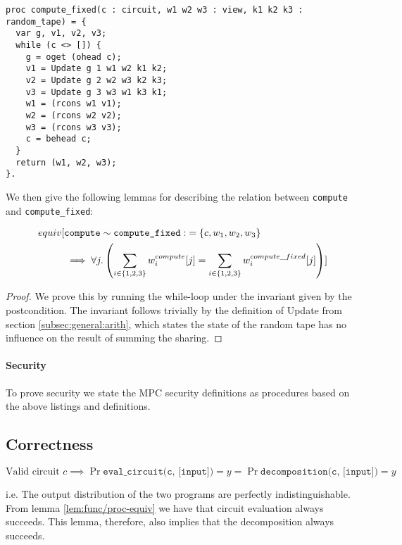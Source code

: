 \begin{lstlisting}[float,label=lst:compute-fixed,caption=Compute with fixed randomness]
proc compute_fixed(c : circuit, w1 w2 w3 : view, k1 k2 k3 : random_tape) = {
  var g, v1, v2, v3;
  while (c <> []) {
    g = oget (ohead c);
    v1 = Update g 1 w1 w2 k1 k2;
    v2 = Update g 2 w2 w3 k2 k3;
    v3 = Update g 3 w3 w1 k3 k1;
    w1 = (rcons w1 v1);
    w2 = (rcons w2 v2);
    w3 = (rcons w3 v3);
    c = behead c;
  }
  return (w1, w2, w3);
}.
\end{lstlisting}

We then give the following lemmas for describing the relation between
\texttt{compute} and \texttt{compute\_fixed}:

\begin{lemma}
  \label{lem:compute/compute-fixed}
  \begin{align*}
    equiv[&\texttt{compute} \sim \texttt{compute\_{fixed}} : \; =\{c, w_{1}, w_{2}, w_{3}\} \\
    &\implies \forall j.\left(\sum_{i \in \{1,2,3\}} w_{i}^{compute}[j] = \sum_{i \in \{1,2,3\}} w_{i}^{compute\_{fixed}}[j]\right)]
  \end{align*}
\end{lemma}
\begin{proof}
  We prove this by running the while-loop under the invariant given by the
  postcondition.
  The invariant follows trivially by the definition of Update from section
  \ref{subsec:general:arith}, which states the state of the random tape has no
  influence on the result of summing the sharing.
\end{proof}

\paragraph{Security}
To prove security we state the MPC security definitions as procedures based on
the above listings and definitions.

\subsection{Correctness}
\label{sec:decomp_correct}
\begin{lemma}
  \label{lem:decomposition_correctness}

  \[
    \text{Valid circuit } c \implies
    \Pr{\texttt{eval\_circuit(c, [input])} = y} =
    \Pr{\texttt{decomposition(c, [input])} = y}
  \]

  i.e. The output distribution of the two programs are perfectly
  indistinguishable. From lemma \ref{lem:func/proc-equiv} we have that circuit
  evaluation always succeeds. This lemma, therefore, also implies that the
  decomposition always succeeds.
\end{lemma}

